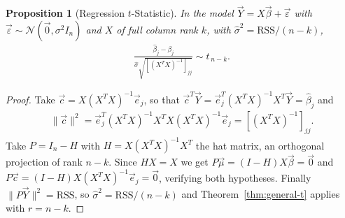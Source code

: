 \documentclass[11pt]{article}
\theoremstyle{definition}
\theoremstyle{plain}
\newtheorem{proposition}{Proposition}[section]
\theoremstyle{remark}
\begin{document}
\begin{proposition}[Regression $t$-Statistic]
    In the model $\vec{Y} = X\vec{\beta}+\vec{\varepsilon}$ with $\vec{\varepsilon}\sim\mathcal{N}(\vec{0},\sigma^2I_n)$ and $X$ of full column rank $k$, with $\hat{\sigma}^2 = \mathrm{RSS}/(n-k)$,
    \begin{align}
        \frac{\hat{\beta}_j - \beta_j}{\hat{\sigma}\sqrt{\left[(X^TX)^{-1}\right]_{jj}}} \sim t_{\,n-k}.
    \end{align}
\end{proposition}
\begin{proof}
    Take $\vec{c} = X(X^TX)^{-1}\vec{e}_j$, so that $\vec{c}^T\vec{Y} = \vec{e}_j^T(X^TX)^{-1}X^T\vec{Y} = \hat{\beta}_j$ and
    \begin{align}
        \|\vec{c}\|^2 = \vec{e}_j^T(X^TX)^{-1}X^TX(X^TX)^{-1}\vec{e}_j = \left[(X^TX)^{-1}\right]_{jj}.
    \end{align}
    Take $P = I_n - H$ with $H = X(X^TX)^{-1}X^T$ the hat matrix, an orthogonal projection of rank $n-k$. Since $HX = X$ we get $P\vec{\mu} = (I-H)X\vec{\beta} = \vec{0}$ and $P\vec{c} = (I-H)X(X^TX)^{-1}\vec{e}_j = \vec{0}$, verifying both hypotheses. Finally $\|P\vec{Y}\|^2 = \mathrm{RSS}$, so $\hat{\sigma}^2 = \mathrm{RSS}/(n-k)$ and Theorem~\ref{thm:general-t} applies with $r = n-k$.
\end{proof}
\end{document}
